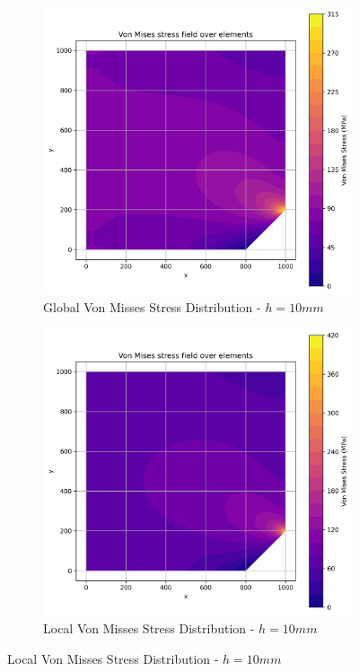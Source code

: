 \begin{figure}[H]
  \centering
  \begin{subfigure}[b]{0.45\textwidth}
    \centering
    \includegraphics[width=\textwidth]{GRAFICOS/Quad4/1.25mm_global/resultados_von_mises.png}
    \caption{Global Von Misses Stress Distribution - $h=10mm$}
    \label{fig:img13}
  \end{subfigure}
  \hfill
  \begin{subfigure}[b]{0.45\textwidth}
    \centering
    \includegraphics[width=\textwidth]{GRAFICOS/Quad4/1.25mm_local/resultados_von_mises.png}
    \caption{Local Von Misses Stress Distribution - $h=10mm$}
    \label{fig:img23}
  \end{subfigure}
\end{figure}

